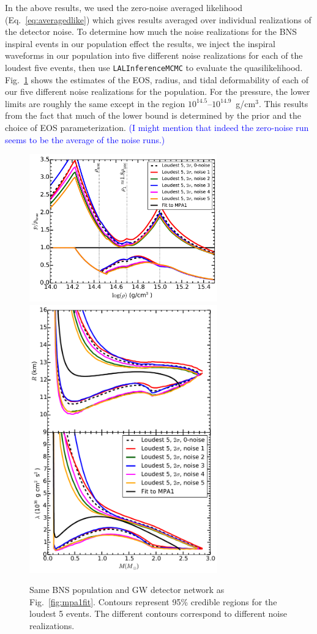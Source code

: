 \documentclass[twocolumn,prd,amssymb,aps,nofootinbib,showpacs,epsf]{revtex4}
\newcommand\les[2]{\textcolor{blue}{{#1}\sout{#2}}}
\begin{document}
In the above results, we used the zero-noise averaged likelihood (Eq.~\eqref{eq:averagedlike}) which gives results averaged over individual realizations of the detector noise. To determine how much the noise realizations for the BNS inspiral events in our population effect the results, we inject the inspiral waveforms in our population into five different noise realizations for each of the loudest five events, then use \texttt{LALInferenceMCMC} to evaluate the quasilikelihood. Fig.~\ref{fig:noise} shows the estimates of the EOS, radius, and tidal deformability of each of our five different noise realizations for the population. For the pressure, the lower limits are roughly the same except in the region $10^{14.5}$--$10^{14.9}$~g/cm$^3$. This results from the fact that much of the lower bound is determined by the prior and the choice of EOS parameterization. \les{(I might mention that indeed the zero-noise run seems to be the average of the noise runs.)}{}

\begin{figure}[!htb]
\begin{center}
\includegraphics[width=3.2in]{LALMCMCmpa1FitTaylorF2CompareNoiseperror.pdf}\\
\includegraphics[width=3.2in]{LALMCMCmpa1FitTaylorF2CompareNoiseRadiuslambda.pdf}\caption{Same BNS population and GW detector network as Fig.~\ref{fig:mpa1fit}. Contours represent 95\% credible regions for the loudest 5 events. The different contours correspond to different noise realizations.}
\label{fig:noise}
\end{center}
\end{figure}
\end{document}
